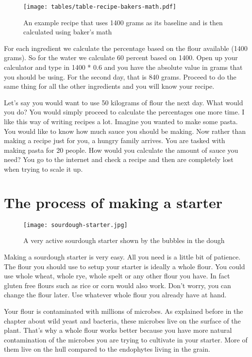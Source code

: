 \begin{figure}[H]
  \texttt{[image: tables/table-recipe-bakers-math.pdf]}
  \caption{An example recipe that uses 1400 grams as its baseline and
  is then calculated using baker's math}
\end{figure}

For each ingredient we calculate the percentage
based on the flour available (1400 grams). So for the water
we calculate 60 percent based on 1400. Open up your
calculator and type in 1400 * 0.6 and you have
the absolute value in grams that you should be using.
For the second day, that is 840 grams. Proceed to do the same
thing for all the other ingredients and you will know
your recipe.


Let's say you would want to use 50 kilograms of flour
the next day. What would you do? You would simply proceed
to calculate the percentages one more time. I like this
way of writing recipes a lot. Imagine you wanted to make
some pasta. You would like to know how much sauce you should
be making. Now rather than making a recipe just for you, a
hungry family arrives. You are tasked with making pasta
for 20 people. How would you calculate the amount of sauce
you need? You go to the internet and check a recipe and then
are completely lost when trying to scale it up.

\section{The process of making a starter}

\begin{figure}[!htb]
  \texttt{[image: sourdough-starter.jpg]}
  \caption{A very active sourdough starter shown by the bubbles in the dough}
  \label{fig:sourdough-starter}
\end{figure}

Making a sourdough starter is very easy. All you need
is a little bit of patience. The flour you should
use to setup your starter is ideally a whole flour.
You could use whole wheat, whole rye, whole spelt or
any other flour you have. In fact gluten free flours such
as rice or corn would also work. Don't worry, you can
change the flour later. Use whatever whole flour you
already have at hand.

Your flour is contaminated with millions of microbes. As explained
before in the chapter about wild yeast and bacteria, these
microbes live on the surface of the plant. That's why
a whole flour works better because you have more natural
contamination of the microbes you are trying to cultivate
in your starter. More of them live on the hull compared to the
endophytes living in the grain.

